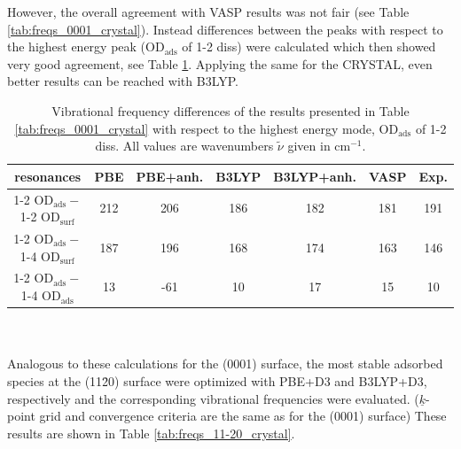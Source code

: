 \documentclass[11pt,DIV=13,BCOR=5mm,a4paper,headinclude]{scrbook}
\renewcommand{\vec}[1]{\underline{#1}}
\begin{document}
However, the overall agreement with VASP results was not fair (see Table \ref{tab:freqs_0001_crystal}).
Instead differences between the peaks with respect to the highest energy peak (OD$_\textrm{ads}$ of 1-2 diss) were calculated which then showed very good agreement, see Table \ref{tab:freqs_0001_crystal-relative}.
Applying the same for the CRYSTAL, even better results can be reached with B3LYP.
\begin{table}[!h]
  \centering
  \caption{Vibrational frequency differences of the results presented in Table \ref{tab:freqs_0001_crystal} with respect to the highest energy mode, OD$_\textrm{ads}$ of 1-2 diss.
All values are wavenumbers $\tilde{\nu}$ given in cm$^{-1}$.}
  \begin{tabular}{c|cc|cc|c|c}
  \toprule
   resonances& PBE & PBE+anh. & B3LYP & B3LYP+anh. &VASP&Exp.\\\midrule
  1-2 OD$_\textrm{ads}-$1-2 OD$_\textrm{surf}$&212 &206 &186 &182 &181 &191 \\
  1-2 OD$_\textrm{ads}-$1-4 OD$_\textrm{surf}$&187 &196 &168 &174 &163 &146 \\
  1-2 OD$_\textrm{ads}-$1-4 OD$_\textrm{ads}$ &13 &-61 &10 &17 &15 &10 \\\bottomrule
    \end{tabular}
  \label{tab:freqs_0001_crystal-relative}
\end{table}
\\\\
Analogous to these calculations for the (0001) surface, the most stable adsorbed species at the (11\=20) surface were optimized with PBE+D3 and B3LYP+D3, respectively and the corresponding vibrational frequencies were evaluated.
($\vec{k}$-point grid and convergence criteria are the same as for the (0001) surface)
These results are shown in Table \ref{tab:freqs_11-20_crystal}.
\end{document}
